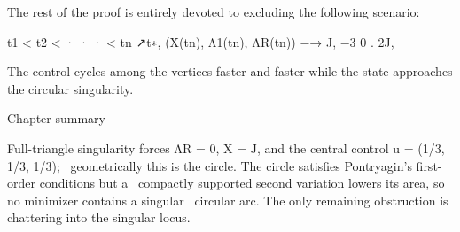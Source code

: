 The rest of the proof is entirely devoted to excluding the following scenario:


\begin{displaytext}
t1 < t2 < · · · < tn ↗t∗, (X(tn), Λ1(tn), ΛR(tn)) −→ J, −3 0 . 2J,
\end{displaytext}

The control cycles among the vertices faster and faster while the state approaches the circular singularity.


\begin{insightbox}{Chapter summary}
\end{insightbox}

\begin{displaytext}
Full-triangle singularity forces ΛR = 0, X = J, and the central control u = (1/3, 1/3, 1/3); \
geometrically this is the circle. The circle satisfies Pontryagin’s first-order conditions but a \
compactly supported second variation lowers its area, so no minimizer contains a singular \
circular arc. The only remaining obstruction is chattering into the singular locus.
\end{displaytext}
